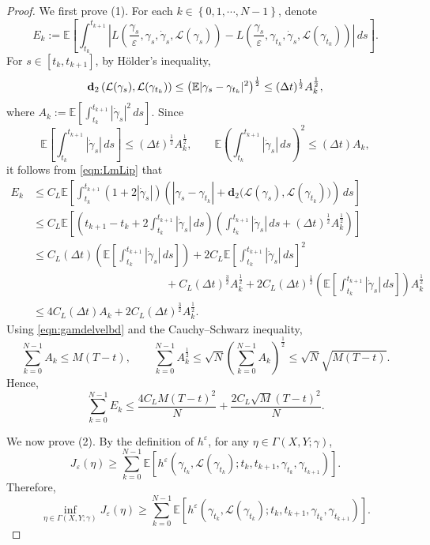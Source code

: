 \documentclass[reqno,11pt]{amsart}
\numberwithin{equation}{section}
\newcommand{\e}{\varepsilon}
\newcommand{\ep}{\varepsilon}
\begin{document}
\begin{proof}
We first prove (1). For each $k \in \left\{0, 1, \cdots, N-1\right\}$, denote
\[
E_k:=\mathbb{E}\left[\int_{t_k}^{t_{k+1}} \left|L\left( \frac{\gamma_s}{\e}, \gamma_s, \dot{\gamma}_s, \mathcal{L}(\gamma_s) \right)-
L\left(\frac{\gamma_s}{\ep}, \gamma_{t_k}, \dot{\gamma}_s, \mathcal{L}(\gamma_{t_k})\right)\right|\,ds\right].
\]
For $s\in[t_k, t_{k+1}]$, by H{\"o}lder's inequality,
\[
 {\bf d}_2\left(\mathcal{L}(\gamma_s), \mathcal{L}(\gamma_
    {t_k})\right) \leq \left(\mathbb{E}|\gamma_s-\gamma_{t_k}|^2 \right)^\frac{1}{2}\leq (\Delta t)^\frac{1}{2} A_k^\frac{1}{2},
\]
where $A_k := \mathbb{E}\left[\int_{t_k}^{t_{k+1}} |\dot{\gamma}_s|^2\,ds\right]$.
Since
\[
\mathbb{E}\left[\int_{t_k}^{t_{k+1}} |\dot{\gamma}_s|\,ds\right]
\le (\Delta t)^\frac{1}{2} A_k^\frac{1}{2},
\qquad
\mathbb{E}\left(\int_{t_k}^{t_{k+1}}|\dot\gamma_s|\,ds\right)^2
\le (\Delta t) A_k,
\]
it follows from \eqref{eqn:LmLip} that
\[
\begin{aligned}
E_k
&\le C_L \mathbb{E}\left[\int_{t_k}^{t_{k+1}}
\left(1+2|\dot\gamma_s|\right)
\left(
|\gamma_s-\gamma_{t_k}|
+ \mathbf d_2\bigl(\mathcal{L}(\gamma_s),\mathcal{L}(\gamma_{t_k})\bigr)
\right)\,ds \right]\\
&\le C_L \mathbb{E}\left[
\left(
t_{k+1}-t_k + 2\int_{t_k}^{t_{k+1}} |\dot\gamma_s|\,ds
\right)
\left(
\int_{t_k}^{t_{k+1}} |\dot\gamma_s|\,ds
+ (\Delta t)^{\frac{1}{2}} A_k^{\frac{1}{2}}
\right)
\right] \\
& \leq C_L (\Delta t )\left(\mathbb{E}\left[\int_{t_k}^{t_{k+1}} |\dot\gamma_s|\,ds\right]\right)
+2C_L \mathbb{E} \left[\int_{t_k}^{t_{k+1}} |\dot\gamma_s|\,ds\right]^2 \\
&\qquad \qquad \qquad \qquad \qquad \qquad + C_L (\Delta t)^{\frac{3}{2}} A_k^{\frac{1}{2}}
+2C_L (\Delta t)^{\frac{1}{2}}
\left(\mathbb{E}\left[\int_{t_k}^{t_{k+1}} |\dot\gamma_s|\,ds\right]\right) A_k^\frac{1}{2}\\
&\leq 4C_L (\Delta t) A_k
+ 2C_L (\Delta t)^{\frac{3}{2}} A_k^\frac{1}{2}.
\end{aligned}
\]
Using \eqref{eqn:gamdelvelbd} and the Cauchy–Schwarz inequality,
\[
\sum_{k=0}^{N-1}A_k\leq M(T-t) ,\qquad\sum_{k=0}^{N-1}A_k^\frac{1}{2} \leq \sqrt{N} \left(\sum_{k=0}^{N-1}A_k\right)^\frac{1}{2}\leq \sqrt{N} \sqrt{M(T-t)}.
\]
Hence,
\[
\sum_{k=0}^{N-1}E_k \leq  \frac{4C_LM(T-t)^2}{N} +   \frac{2C_L \sqrt{M}(T-t)^2}{N}.
\]

We now prove {\rm (2)}. By the definition of $h^\e$, for any $\eta\in \Gamma(X,Y;\gamma)$,
\[
J_\e(\eta)
\ge
\sum_{k=0}^{N-1}
 \mathbb{E}\left[
h^\e\left(\gamma_{t_k}, \mathcal{L}(\gamma_{t_k});t_k,t_{k+1},
\gamma_{t_k},\gamma_{t_{k+1}}\right)\right].
\]
Therefore,
\[
\inf_{\eta\in\Gamma(X,Y;\gamma)}J_\varepsilon(\eta)
\ge
\sum_{k=0}^{N-1}
\mathbb E\left[
h^\varepsilon\left(
\gamma_{t_k},
\mathcal{L}(\gamma_{t_k});
t_k,t_{k+1},
\gamma_{t_k},\gamma_{t_{k+1}}
\right)
\right].
\]


\end{proof}
\end{document}
